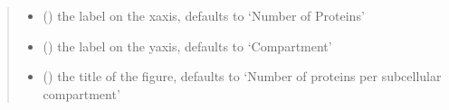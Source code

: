 \documentclass[letterpaper,10pt,english]{sphinxmanual}
\begin{document}
\begin{fulllineitems}
\begin{quote}
\begin{description}
\begin{itemize}
\item {} 
 (\sphinxstyleliteralemphasis{\sphinxupquote{, }}) \textendash{} the label on the x\sphinxhyphen{}axis, defaults to ‘Number of Proteins’

\item {} 
 (\sphinxstyleliteralemphasis{\sphinxupquote{, }}) \textendash{} the label on the y\sphinxhyphen{}axis, defaults to ‘Compartment’

\item {} 
 (\sphinxstyleliteralemphasis{\sphinxupquote{, }}) \textendash{} the title of the figure, defaults to ‘Number of proteins per sub\sphinxhyphen{}cellular compartment’

\end{itemize}

\end{description}\end{quote}

\end{fulllineitems}

\end{document}
